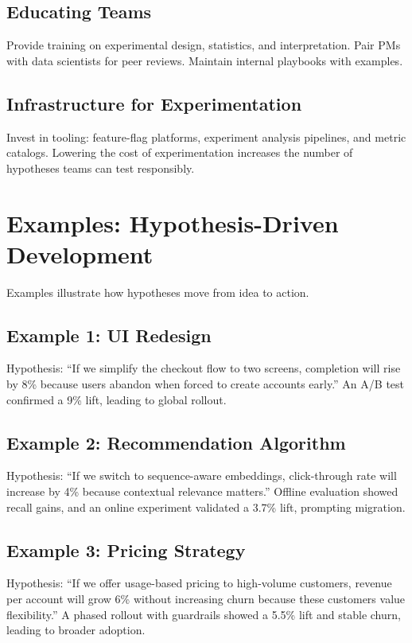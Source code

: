 \subsection{Educating Teams}
Provide training on experimental design, statistics, and interpretation. Pair PMs with data scientists for peer reviews. Maintain internal playbooks with examples.

\subsection{Infrastructure for Experimentation}
Invest in tooling: feature-flag platforms, experiment analysis pipelines, and metric catalogs. Lowering the cost of experimentation increases the number of hypotheses teams can test responsibly.

\section{Examples: Hypothesis-Driven Development}
\label{sec:hypothesis-examples}

Examples illustrate how hypotheses move from idea to action.

\subsection{Example 1: UI Redesign}
Hypothesis: ``If we simplify the checkout flow to two screens, completion will rise by 8\% because users abandon when forced to create accounts early.'' An A/B test confirmed a 9\% lift, leading to global rollout.

\subsection{Example 2: Recommendation Algorithm}
Hypothesis: ``If we switch to sequence-aware embeddings, click-through rate will increase by 4\% because contextual relevance matters.'' Offline evaluation showed recall gains, and an online experiment validated a 3.7\% lift, prompting migration.

\subsection{Example 3: Pricing Strategy}
Hypothesis: ``If we offer usage-based pricing to high-volume customers, revenue per account will grow 6\% without increasing churn because these customers value flexibility.'' A phased rollout with guardrails showed a 5.5\% lift and stable churn, leading to broader adoption.

